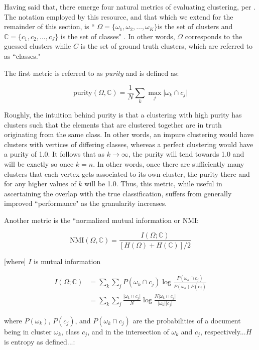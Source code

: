 \documentclass{article}
\begin{document}
Having said that, there emerge four natural metrics of evaluating clustering, per \cite{evaluation}. The notation employed by this resource, and that which we extend for the remainder of this section, is `` $\Omega = \{ \omega_1, \omega_2, \ldots, \omega_K \}$is the set of clusters and $\mathbb{C} = \{ c_1,c_2,\ldots,c_J \}$  is the set of classes" \cite{evaluation}. In other words, $\Omega$ corresponds to the guessed clusters while $C$ is the set of ground truth clusters, which are referred to as ``classes." 

The first metric is referred to as \textit{purity} and is defined as:

$$ \text{purity}( \Omega,\mathbb{C} ) = \frac{1}{N} \sum_k \max_j \vert\omega_k \cap c_j\vert $$

Roughly, the intuition behind purity is that a clustering with high purity has clusters such that the elements that are clustered together are in truth originating from the same class. In other words, an impure clustering would have clusters with vertices of differing classes, whereas a perfect clustering would have a purity of 1.0. It follows that as $k\rightarrow\infty$, the purity will tend towards 1.0 and will be exactly so once $k=n$. In other words, once there are sufficiently many clusters that each vertex gets associated to its own cluster, the purity there and for any higher values of $k$ will be 1.0. Thus, this metric, while useful in ascertaining the overlap with the true classification, suffers from generally improved ``performance" as the granularity increases. 

Another metric is the ``normalized mutual information or NMI:

$$ \text{NMI}(\Omega , \mathbb{C}) = \frac{ I(\Omega ; \mathbb{C}) } { [H(\Omega)+ H(\mathbb{C} )]/2 } $$

[where] $I$ is mutual information

\begin{align}
I( \Omega ; \mathbb{C} ) &= \sum_k \sum_j P(\omega_k \cap c_j) \log \frac{P(\omega_k \cap c_j)}{P(\omega_k)P(c_j)} \\
&= \sum_k \sum_j \frac{\vert\omega_k \cap c_j\vert}{N} \log \frac{N\vert\omega_k \cap c_j\vert}{\vert\omega_k\vert\vert c_j\vert}
\end{align}

where $P(\omega_k)$, $P(c_j)$, and $P(\omega_k \cap c_j)$ are the probabilities of a document being in cluster $\omega_k$, class $c_j$, and in the intersection of $\omega_k$ and $c_j$, respectively...$H$ is entropy as defined...:
\end{document}
